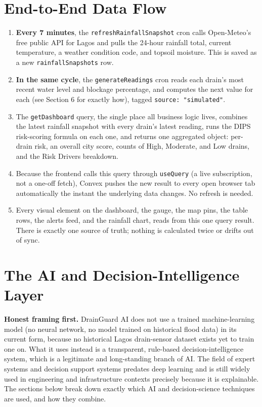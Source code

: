 \documentclass[11pt]{article}
\begin{document}
\section{End-to-End Data Flow}
\begin{enumerate}
  \item \textbf{Every 7 minutes}, the \texttt{refreshRainfallSnapshot} cron calls Open-Meteo's free public API for Lagos and pulls the 24-hour rainfall total, current temperature, a weather condition code, and topsoil moisture. This is saved as a new \texttt{rainfallSnapshots} row.
  \item \textbf{In the same cycle}, the \texttt{generateReadings} cron reads each drain's most recent water level and blockage percentage, and computes the next value for each (see Section 6 for exactly how), tagged \texttt{source: "simulated"}.
  \item The \texttt{getDashboard} query, the single place all business logic lives, combines the latest rainfall snapshot with every drain's latest reading, runs the DIPS risk-scoring formula on each one, and returns one aggregated object: per-drain risk, an overall city score, counts of High, Moderate, and Low drains, and the Risk Drivers breakdown.
  \item Because the frontend calls this query through \texttt{useQuery} (a live subscription, not a one-off fetch), Convex pushes the new result to every open browser tab automatically the instant the underlying data changes. No refresh is needed.
  \item Every visual element on the dashboard, the gauge, the map pins, the table rows, the alerts feed, and the rainfall chart, reads from this one query result. There is exactly one source of truth; nothing is calculated twice or drifts out of sync.
\end{enumerate}

\section{The AI and Decision-Intelligence Layer}
\textbf{Honest framing first.} DrainGuard AI does not use a trained machine-learning model (no neural network, no model trained on historical flood data) in its current form, because no historical Lagos drain-sensor dataset exists yet to train one on. What it uses instead is a transparent, rule-based decision-intelligence system, which is a legitimate and long-standing branch of AI. The field of expert systems and decision support systems predates deep learning and is still widely used in engineering and infrastructure contexts precisely because it is explainable. The sections below break down exactly which AI and decision-science techniques are used, and how they combine.
\end{document}
